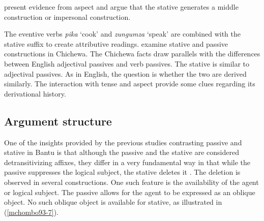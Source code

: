 \documentclass[output=paper]{langscibook}
\begin{document}
\citet{SeidlDimitriadis2003} present evidence from aspect and argue that the stative generates a middle construction or impersonal construction.\largerpage

\begin{exe}
\ex\label{sd03}\citep[248]{SeidlDimitriadis2003}
\begin{xlist}
\end{xlist}
\end{exe}
The eventive verbs \textit{pika} `cook' and \textit{zungumza} `speak' are combined with the stative suffix to create attributive readings. \citet{Dubinsky:1996} examine stative and passive constructions in Chichewa. The Chichewa facts draw parallels with the differences between English adjectival passives and verb passives. The stative is similar to adjectival passives. As in English, the question is whether the two are derived similarly. The interaction with tense and aspect provide some clues regarding its derivational history. 

\subsection{Argument structure}
One of the insights provided by the previous studies contrasting passive and stative in Bantu is that although the passive and the stative are considered detransitivizing affixes, they differ in a very fundamental way in that while the passive suppresses the logical subject, the stative deletes it \citep{Dubinsky:1996,Mchombo:1993aa,SeidlDimitriadis2003}. The deletion is observed in several constructions. One such feature is the availability of the agent or logical subject. The passive allows for the agent to be expressed as an oblique object. No such oblique object is available for stative, as illustrated in (\ref{mchombo93-7}).
\end{document}
